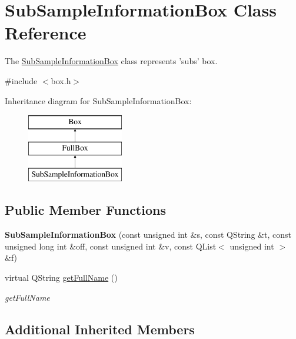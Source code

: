 \hypertarget{class_sub_sample_information_box}{\section{Sub\-Sample\-Information\-Box Class Reference}
\label{class_sub_sample_information_box}
}


The \hyperlink{class_sub_sample_information_box}{Sub\-Sample\-Information\-Box} class represents 'subs' box.  




{\ttfamily \#include $<$box.\-h$>$}

Inheritance diagram for Sub\-Sample\-Information\-Box\-:\begin{figure}[H]
\begin{center}
\leavevmode
\includegraphics[height=3.000000cm]{class_sub_sample_information_box}
\end{center}
\end{figure}
\subsection*{Public Member Functions}
\begin{DoxyCompactItemize}
\item 
\hypertarget{class_sub_sample_information_box_a6b2c98cc4760111acb576b6453a794f3}{{\bfseries Sub\-Sample\-Information\-Box} (const unsigned int \&s, const Q\-String \&t, const unsigned long int \&off, const unsigned int \&v, const Q\-List$<$ unsigned int $>$ \&f)}\label{class_sub_sample_information_box_a6b2c98cc4760111acb576b6453a794f3}

\item 
virtual Q\-String \hyperlink{class_sub_sample_information_box_a8220480e149473cb07bd86e6dae71701}{get\-Full\-Name} ()
\begin{DoxyCompactList}\small\item\em get\-Full\-Name \end{DoxyCompactList}\end{DoxyCompactItemize}
\subsection*{Additional Inherited Members}


